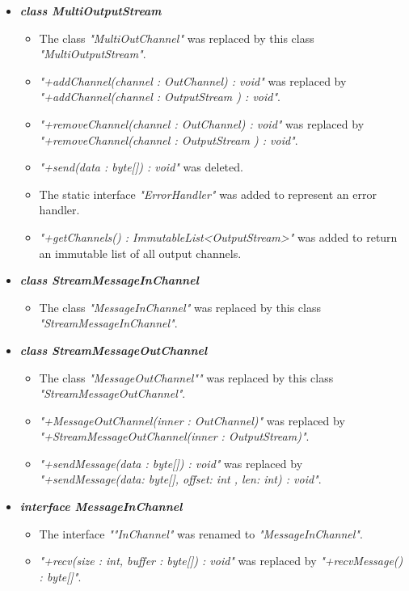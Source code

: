 \documentclass[a4paper,10pt]{scrartcl}
\begin{document}
\begin{itemize}
   \item \textbf{\textit{class MultiOutputStream}}
  \begin{itemize}
	 \item The class \textit{"MultiOutChannel"} was replaced by this class \textit{"MultiOutputStream"}.
	 \item \textit{"+addChannel(channel : OutChannel) : void"} was replaced by 
	 \textit{"+addChannel(channel : OutputStream ) : void"}.
	 \item \textit{"+removeChannel(channel : OutChannel) : void"} was replaced by 
	 \textit{"+removeChannel(channel : OutputStream ) : void"}.
	 \item \textit{"+send(data : byte[]) : void"} was deleted.
	 \item The static interface \textit{"ErrorHandler"} was added to represent an error handler.
	 \item \textit{"+getChannels() : ImmutableList<OutputStream>"} was added to return an immutable 
	 list of all output channels.
	\end{itemize}
 
   \item \textbf{\textit{class StreamMessageInChannel}}
	\begin{itemize}
	 \item The class \textit{"MessageInChannel"} was replaced by this class \textit{"StreamMessageInChannel"}.
	\end{itemize}
	
   \item \textbf{\textit{class StreamMessageOutChannel}}
	\begin{itemize}
	 \item The class \textit{"MessageOutChannel""} was replaced by this class \textit{"StreamMessageOutChannel"}.
	 \item \textit{"+MessageOutChannel(inner : OutChannel)"} was replaced by 
	 \textit{"+StreamMessageOutChannel(inner : OutputStream)"}.
	 \item \textit{"+sendMessage(data : byte[]) : void"} was replaced by 
	 \textit{"+sendMessage(data: byte[], offset: int , len: int) : void"}.
	\end{itemize}
	
   \item \textbf{\textit{interface MessageInChannel}}
	\begin{itemize}
	 \item The interface \textit{""InChannel"} was renamed to \textit{"MessageInChannel"}.
	 \item \textit{"+recv(size : int, buffer : byte[]) : void"} was replaced by \textit{"+recvMessage() : byte[]"}.
	\end{itemize}
	

\end{itemize}
\end{document}
